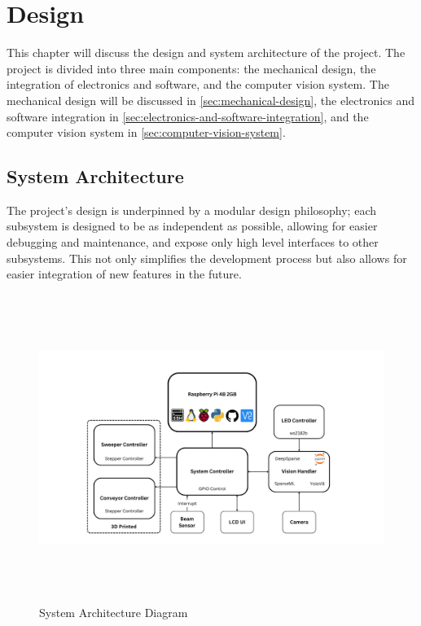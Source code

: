 \section{Design}
\label{sec:design-and-system-architecture}

This chapter will discuss the design and system architecture of the project. The project is divided into three main components: the mechanical design, the integration of electronics and software, and the computer vision system. The mechanical design will be discussed in \autoref{sec:mechanical-design}, the electronics and software integration in \autoref{sec:electronics-and-software-integration}, and the computer vision system in \autoref{sec:computer-vision-system}.

\subsection{System Architecture}
\label{sec:system-architecture}

The project's design is underpinned by a modular design philosophy; each subsystem is designed to be as independent as possible, allowing for easier debugging and maintenance, and expose only high level interfaces to other subsystems. This not only simplifies the development process but also allows for easier integration of new features in the future.

\begin{figure}[H]
    \begin{minipage}[h]{\textwidth}
        \centering
        \includegraphics[height=10cm]{imgs/diagrams/System Diagram.png}
        \caption{System Architecture Diagram}
    \end{minipage}
\end{figure}

